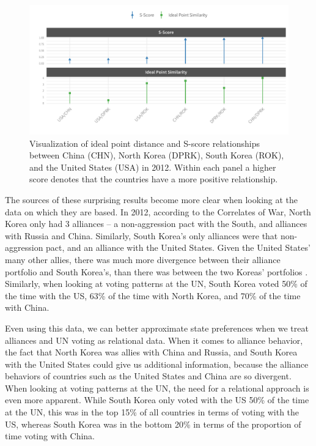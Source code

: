 \documentclass[12pt,pdflatex]{elsarticle}
\begin{document}
\begin{figure}[ht]
	\includegraphics[width=1\textwidth]{idPtScoreViz.pdf}
	\caption{Visualization of ideal point distance and S-score relationships between China (CHN), North Korea (DPRK), South Korea (ROK), and the United States (USA) in 2012. Within each panel a higher score denotes that the countries have a more positive relationship.}
	\label{korean:prefs}
\end{figure}

The sources of these surprising results become more clear when looking at the data on which they are based. In 2012, according to the Correlates of War, North Korea only had 3 alliances -- a non-aggression pact with the South, and alliances with Russia and China. Similarly, South Korea's only alliances were that non-aggression pact, and an alliance with the United States. Given the United States' many other allies, there was much more divergence between their alliance portfolio and South Korea's, than there was between the two Koreas' portfolios \citep{gibler:sarkees:2004}. Similarly, when looking at voting patterns at the UN, South Korea voted 50\% of the time with the US, 63\% of the time with North Korea, and 70\% of the time with China.

Even using this data, we can better approximate state preferences when we treat alliances and UN voting as relational data. When it comes to alliance behavior, the fact that North Korea was allies with China and Russia, and South Korea with the United States could give us additional information, because the alliance behaviors of countries such as the United States and China are so divergent. When looking at voting patterns at the UN, the need for a relational approach is even more apparent. While South Korea only voted with the US 50\% of the time at the UN, this was in the top 15\% of all countries in terms of voting with the US, whereas South Korea was in the bottom 20\% in terms of the proportion of time voting with China.
\end{document}
